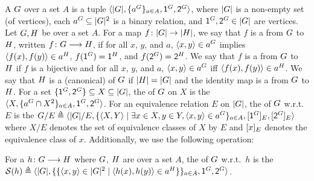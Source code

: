 \newcommand{\FillS}{\mathcal{S}}
A \intro*{} $\graph$ over a set $A$ is a tuple $\tuple{\domain{\graph}, \set{a^{\graph}}_{a \in A}, \src^{\graph}, \tgt^{\graph}}$, where
$\domain{\graph}$ is a non-empty set (of vertices),
each $a^{\graph} \subseteq \domain{\graph}^{2}$ is a binary relation, and
$\src^{\graph}, \tgt^{\graph} \in \domain{\graph}$ are vertices.
Let $\graph[1], \graph[2]$ be  over a set $A$.
For a map $f \colon \domain{\graph[1]} \to \domain{\graph[2]}$,
we say that $f$ is a \intro*{} from $\graph[1]$ to $\graph[2]$, written $f \colon \graph \homo \graph[2]$, if
for all $x$, $y$, and $a$, $\tuple{x, y} \in a^{\graph[1]}$ implies $\tuple{f(x), f(y)} \in a^{\graph[2]}$,
$f(\src^{\graph[1]}) = \src^{\graph[2]}$, and $f(\tgt^{\graph[1]}) = \tgt^{\graph[2]}$.
We say that $f$ is a \intro*{} from $\graph[1]$ to $\graph[2]$ if
$f$ is a bijective  and for all $x$, $y$, and $a$, $\tuple{x, y} \in a^{\graph[1]}$ iff $\tuple{f(x), f(y)} \in a^{\graph[2]}$.
We say that $\graph[2]$ is a (canonical) \intro*{} of $\graph[1]$ if 
$\domain{\graph[2]} = \domain{\graph[1]}$ and the identity map is a  from $\graph[1]$ to $\graph[2]$.
For a set $\set{\src^{\graph[1]}, \tgt^{\graph[1]}} \subseteq X \subseteq \domain{\graph[1]}$,
the \intro*{} of $\graph[1]$ on $X$ is the  $\tuple{X, \set{a^{\graph[1]} \cap X^2}_{a \in A}, \src^{\graph[1]}, \tgt^{\graph[1]}}$.
For an equivalence relation $E$ on $\domain{\graph[1]}$,
the \intro*{} of $\graph[1]$ w.r.t.\ $E$ is the  $\graph[1]/E \defeq \tuple{\domain{\graph[1]}/E, \set{\tuple{X, Y} \mid \exists x \in X, y \in Y, \tuple{x, y} \in a^{\graph[1]}}_{a \in A}, \quo{\src^{\graph}}_{E}, \quo{\tgt^{\graph}}_{E}}$ where 
$X/E$ denotes the set of equivalence classes of $X$ by $E$ and $[x]_{E}$ denotes the equivalence class of $x$.
Additionally, we use the following operation:
\begin{definition}\label{definition: edge-saturation}
    For a  $h \colon \graph[1] \homo \graph[2]$ where $\graph[1]$, $\graph[2]$ are  over a set $A$,
    the \intro*{} of $\graph[1]$ w.r.t.\ $h$ is the 
    $\FillS(h) \defeq \tuple{\domain{\graph[1]}, \set{\set{\tuple{x, y} \in \domain{\graph[1]}^2 \mid \tuple{h(x), h(y)} \in a^{\graph[2]}}}_{a \in A}, \src^{\graph[1]}, \tgt^{\graph[1]}}$.
\end{definition}

